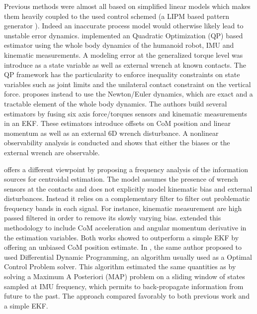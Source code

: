 Previous methods were almost all based on simplified linear models which makes them heavily coupled to the used control schemed (a LIPM based pattern generator \cite{kajita20013d}). Indeed an inaccurate process model
would otherwise likely lead to unstable error dynamics. \cite{xinjilefu2014dynamic} implemented an Quadratic Optimization (QP) based estimator using the whole body dynamics
of the humanoid robot, IMU and kinematic measurements. A modeling error at the generalized torque level was introduce as a state variable as well as external wrench at known contacts. 
The QP framework has the particularity to enforce inequality constraints on state variables such as joint limits and the unilateral contact constraint on the vertical force.
\cite{rotella2015humanoid} proposes instead to use the Newton/Euler dynamics, which are exact and a tractable element of the whole body dynamics. 
The authors build several estimators by fusing six axis force/torques sensors and kinematic measurements in an EKF. 
These estimators introduce offsets on CoM position and linear momentum as well as an external 6D wrench disturbance. A nonlinear observability analysis is conducted 
and shows that either the biases or the external wrench are observable. 

\cite{carpentier2016center} offers a different viewpoint by proposing a frequency analysis of the information sources for centroidal estimation. The model
assumes the presence of wrench sensors at the contacts and does not explicitly model kinematic bias and external disturbances. Instead it relies on a complementary filter
to filter out problematic frequency bands in each signal. For instance, kinematic measurement are high passed filtered in order to remove its slowly varying bias. 
\cite{bailly2019recursive} extended this methodology to include CoM acceleration and angular momentum derivative in the estimation variables. Both works showed to outperform
a simple EKF by offering an unbiased CoM position estimate.
In \cite{bailly2021optimal}, the same author proposed to used Differential Dynamic Programming, an algorithm usually used as a Optimal Control Problem solver.
This algorithm estimated the same quantities as \cite{bailly2019recursive} by solving a Maximum A Posteriori (MAP) problem on a sliding window of states sampled at IMU frequency, 
which permits to back-propagate information from future to the past. The approach compared favorably to both previous work \cite{bailly2019recursive} and a simple EKF.





